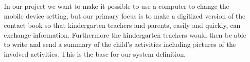 In our project we want to make it possible to use a computer to change the mobile device setting, but our primary focus is to make a digitized version of the contact book so that kindergarten teachers and parents, easily and quickly, can exchange information. Furthermore the kindergarten teachers would then be able to write and send a summary of the child's activities including pictures of the involved activities. This is the base for our system definition.    